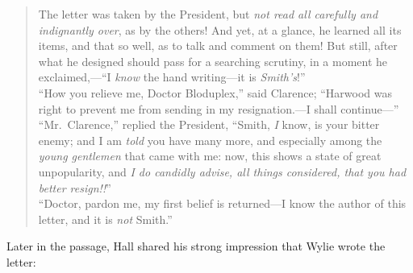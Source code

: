 \documentclass[
  american,
  letterpaper,
]{scrreprt}
\begin{document}
\begin{quote}
The letter was taken by the President, but \emph{not read all carefully
and indignantly over}, as by the others! And yet, at a glance, he
learned all its items, and that so well, as to talk and comment on them!
But still, after what he designed should pass for a searching scrutiny,
in a moment he exclaimed,---``I \emph{know} the hand writing---it is
\emph{Smith's}!''\\
``How you relieve me, Doctor Bloduplex,'' said Clarence; ``Harwood was
right to prevent me from sending in my resignation.---I shall
continue---''\\
``Mr.~Clarence,'' replied the President, ``Smith, \emph{I} know, is your
bitter enemy; and I am \emph{told} you have many more, and especially
among the \emph{young gentlemen} that came with me: now, this shows a
state of great unpopularity, and \emph{I do candidly advise, all things
considered, that you had better resign!!}''\\
``Doctor, pardon me, my first belief is returned---I know the author of
this letter, and it is \emph{not} Smith.''
\end{quote}

Later in the passage, Hall shared his strong impression that Wylie wrote
the letter:
\end{document}
